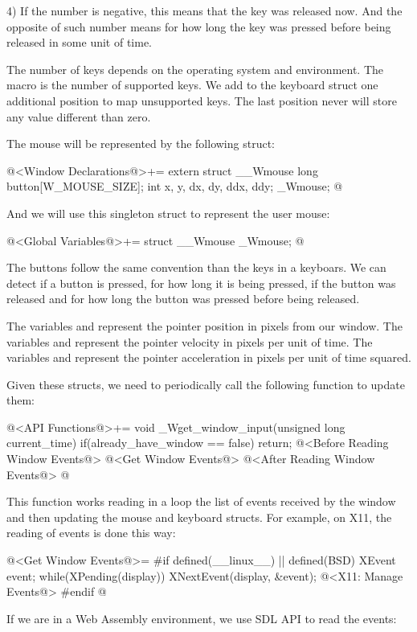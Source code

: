 4) If the number is negative, this means that the key was released
now. And the opposite of such number means for how long the key was
pressed before being released in some unit of time.

The number of keys depends on the operating system and
environment. The macro  is the number of
supported keys. We add to the keyboard struct one additional position
to map unsupported keys. The last position never will store any value
different than zero.

The mouse will be represented by the following struct:

\iniciocodigo
@<Window Declarations@>+=
extern struct __Wmouse{
  long button[W_MOUSE_SIZE];
  int x, y, dx, dy, ddx, ddy;
} _Wmouse;
@
\fimcodigo

And we will use this singleton struct to represent the user mouse:

\iniciocodigo
@<Global Variables@>+=
struct __Wmouse _Wmouse;
@
\fimcodigo

The buttons follow the same convention than the keys in a keyboars. We
can detect if a button is pressed, for how long it is being pressed,
if the button was released and for how long the button was pressed
before being released.

The variables  and  represent the pointer
position in pixels from our window. The variables 
and  represent the pointer velocity in pixels per unit of
time. The variables  and  represent
the pointer acceleration in pixels per unit of time squared.

Given these structs, we need to periodically call the following
function to update them:

\iniciocodigo
@<API Functions@>+=
void _Wget_window_input(unsigned long current_time){
  if(already_have_window == false)
    return;
  @<Before Reading Window Events@>
  @<Get Window Events@>
  @<After Reading Window Events@>
}
@
\fimcodigo

This function works reading in a loop the list of events received by
the window and then updating the mouse and keyboard structs. For
example, on X11, the reading of events is done this way:

\iniciocodigo
@<Get Window Events@>=
#if defined(__linux__) || defined(BSD)
XEvent event;
while(XPending(display)){
  XNextEvent(display, &event);
  @<X11: Manage Events@>
}
#endif
@
\fimcodigo

If we are in a Web Assembly environment, we use SDL API to read the
events:

